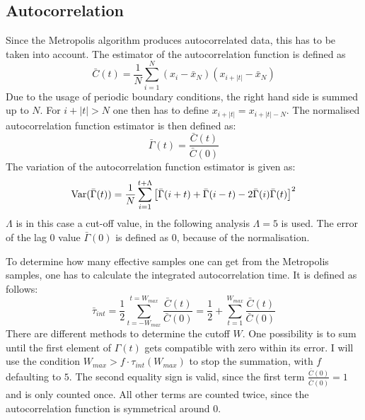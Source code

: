 \documentclass{scrartcl}
\begin{document}
	\subsection{Autocorrelation}
		Since the Metropolis algorithm produces autocorrelated data, this has to be taken into account.
		The estimator of the autocorrelation function is defined as
		\begin{equation}
			\bar C(t) = \frac 1{N} \sum_{i = 1}^{N} (x_i - \bar x_N)(x_{i + |t|} - \bar x_N)
			\label{eq:autocorrelation}
		\end{equation}
		Due to the usage of periodic boundary conditions, the right hand side is summed up to $N$.
		For $i + |t| > N$ one then has to define $x_{i + |t|} = x_{i + |t| - N}$.
		The normalised autocorrelation function estimator is then defined as:
		\begin{equation}
			\bar\Gamma(t) = \frac {\bar C(t)}{\bar C(0)}
			\label{eq:normalised_autocorrelation}
		\end{equation}
		The variation of the autocorrelation function estimator is given as:
		\begin{equation}
			\operatorname{Var}(\bar\Gamma(t)) = \frac 1N \sum_{i=1}^{t + \Lambda}\left[\bar\Gamma(i + t) + \bar\Gamma(i - t) - 2 \bar\Gamma(i)\bar\Gamma(t)\right]^2
			\label{eq:normalised_autocorrelation_error}
		\end{equation}
		$\Lambda$ is in this case a cut-off value, in the following analysis $\Lambda = 5$ is used.
		The error of the lag 0 value $\bar\Gamma(0)$ is defined as 0, because of the normalisation.

		To determine how many effective samples one can get from the Metropolis samples, one has to calculate the integrated autocorrelation time.
		It is defined as follows:
		\begin{equation}
			\bar \tau_{int} = \frac 12 \sum_{t = -W_{max}}^{t = W_{max}} \frac {\bar C(t)}{\bar C(0)} = \frac 12 + \sum_{t = 1}^{W_{max}} \frac {\bar C(t)}{\bar C(0)}
			\label{eq:integrated_autocorrelation}
		\end{equation}
		There are different methods to determine the cutoff $W$.
		One possibility is to sum until the first element of $\Gamma(t)$ gets compatible with zero within its error.
		I will use the condition $W_{max} > f \cdot \tau_{int}(W_{max})$ to stop the summation, with $f$ defaulting to $5$.
		The second equality sign is valid, since the first term $\frac {\bar C(0)}{\bar C(0)} = 1$ and is only counted once.
		All other terms are counted twice, since the autocorrelation function is symmetrical around 0.
\end{document}
